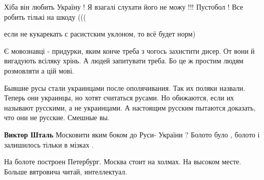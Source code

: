 \begin{itemize}
Хіба він любить Україну ! Я взагалі слухати його не можу !!! Пустобол ! Все робить тількі на шкоду (((

 
если не кукарекать с расистским уклоном, то всё будет норм)

 

Є мовознавці - придурки, яким конче треба з чогось захистити дисер. От вони й
вигадують всіляку хрінь. А людей запитувати треба. Бо це ж простим людям
розмовляти а цій мові.


 

Бывшие русы стали украинцами после ополячивания. Так их поляки назвали. Теперь
они украинцы, но хотят считаться русами. Но обижаются, если их называют
русскими, а не украинцами. А настоящим русским пытаются доказать, что они не
русские. Смешные вы.

\begin{itemize}
 
\textbf{Виктор Шталь} Московити яким боком до Руси- України ? Болото було , болото і залишилось тільки в мізках .

 
На болоте построен Петербург. Москва стоит на холмах. На высоком месте. Больше вятровича читай, интеллектуал.


\end{itemize}
\end{itemize}

